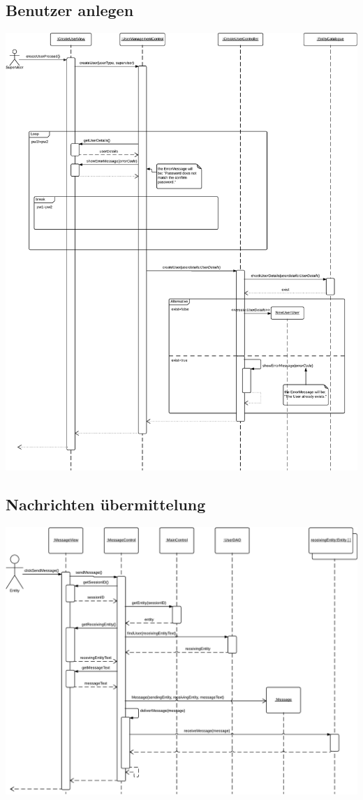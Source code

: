     \newpage
    \subsection{Benutzer anlegen}

        \includegraphics[width=\linewidth]{Diagramms/sequenzes/create_user.pdf}

    \newpage
    \subsection{Nachrichten übermittelung}

        \includegraphics[width=\linewidth]{Diagramms/sequenzes/message_delivery.pdf}

